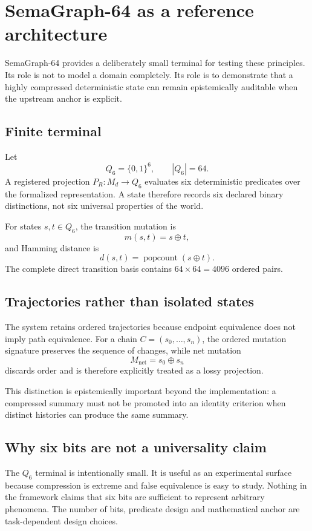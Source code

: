\documentclass[11pt,a4paper]{article}
\newcommand{\B}{\{0,1\}}
\begin{document}
\section{SemaGraph-64 as a reference architecture}
SemaGraph-64 provides a deliberately small terminal for testing these principles. Its role is not to model a domain completely. Its role is to demonstrate that a highly compressed deterministic state can remain epistemically auditable when the upstream anchor is explicit.

\subsection{Finite terminal}
Let
\begin{equation}
Q_6=\B^6, \qquad |Q_6|=64.
\end{equation}
A registered projection $P_R:M_d\rightarrow Q_6$ evaluates six deterministic predicates over the formalized representation. A state therefore records six declared binary distinctions, not six universal properties of the world.

For states $s,t\in Q_6$, the transition mutation is
\begin{equation}
m(s,t)=s\oplus t,
\end{equation}
and Hamming distance is
\begin{equation}
d(s,t)=\operatorname{popcount}(s\oplus t).
\end{equation}
The complete direct transition basis contains $64\times64=4096$ ordered pairs.

\subsection{Trajectories rather than isolated states}
The system retains ordered trajectories because endpoint equivalence does not imply path equivalence. For a chain $C=(s_0,\ldots,s_n)$, the ordered mutation signature preserves the sequence of changes, while net mutation
\begin{equation}
M_{\mathrm{net}}=s_0\oplus s_n
\end{equation}
discards order and is therefore explicitly treated as a lossy projection.

This distinction is epistemically important beyond the implementation: a compressed summary must not be promoted into an identity criterion when distinct histories can produce the same summary.

\subsection{Why six bits are not a universality claim}
The $Q_6$ terminal is intentionally small. It is useful as an experimental surface because compression is extreme and false equivalence is easy to study. Nothing in the framework claims that six bits are sufficient to represent arbitrary phenomena. The number of bits, predicate design and mathematical anchor are task-dependent design choices.
\end{document}
